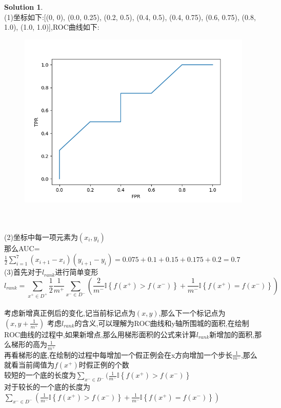 \documentclass[a4paper,UTF8]{article}
\numberwithin{equation}{section}
\theoremstyle{definition}
\newtheorem*{solution}{Solution}
\begin{document}
\begin{solution}
	~\\
	(1)坐标如下:[(0, 0), (0.0, 0.25), (0.2, 0.5), (0.4, 0.5), (0.4, 0.75), (0.6, 0.75), (0.8, 1.0), (1.0, 1.0)],ROC曲线如下:
	\begin{figure}[htbp]
		\centering
		\includegraphics[scale=0.8]{1.jpg}
	\end{figure}\\
	~\\
	(2)坐标中每一项元素为$(x_i,y_i)$\\
	那么AUC=$\frac{1}{2} \sum_{i=1}^{7} (x_{i+1}-x_i)(y_{i+1}-y_i)=0.075+0.1+0.15+0.175+0.2=0.7$\\
	(3)首先对于$l_{rank}$进行简单变形\\
	$$l_{rank}=\sum_{x^+\in D^+} \frac{1}{2} \frac{1}{m^+} \sum_{x^-\in D^-}\left(\frac{2}{m^-}\mathbb{I}\left\{f(x^+) > f(x^-)\right\}+\frac{1}{m^-}\mathbb{I}\left\{f(x^+)=f(x^-)\right\}\right)$$\\
	考虑新增真正例后的变化,记当前标记点为$(x,y)$,那么下一个标记点为$(x,y+\frac{1}{m^+})$
	考虑$l_{rank}$的含义,可以理解为ROC曲线和y轴所围城的面积,在绘制ROC曲线的过程中,如果新增点,那么用梯形面积的公式来计算$l_{rank}$新增加的面积,那么梯形的高为$\frac{1}{m^+}$\\
	再看梯形的底,在绘制的过程中每增加一个假正例会在x方向增加一个步长$\frac{1}{m^-}$,那么就看当前阈值为$f(x^+)$时假正例的个数\\
	较短的一个底的长度为$\sum_{x^-\in D^-} (\frac{1}{m^-}\mathbb{I}\left\{f(x^+) > f(x^-)\right\}$\\
	对于较长的一个底的长度为$\sum_{x^-\in D^-}\left(\frac{1}{m^-}\mathbb{I}\left\{f(x^+) > f(x^-)\right\}+\frac{1}{m^-}\mathbb{I}\left\{f(x^+)=f(x^-)\right\}\right)$\\

\end{solution}
\end{document}
